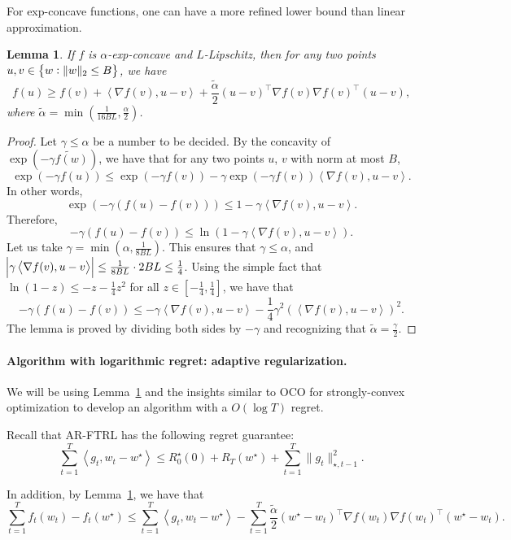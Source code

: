 \documentclass{article}
\newtheorem{lemma}{Lemma}
\newcommand{\inner}[2]{\left\langle #1,#2 \right\rangle}
\begin{document}
For exp-concave functions, one can have a more refined lower bound than linear approximation.
\begin{lemma}
If $f$ is $\alpha$-exp-concave and $L$-Lipschitz,
then for any two points $u, v \in \cbr{w: \| w \|_2 \leq B}$, we have
\[ f(u) \geq f(v) + \inner{\nabla f(v)}{u - v} + \frac{\tilde{\alpha}}{2}(u - v)^\top \nabla f(v) \nabla f(v)^\top (u - v), \]
where $\tilde{\alpha} = \min(\frac{1}{16BL}, \frac\alpha2)$.
\label{lem:quad-approx}
\end{lemma}
\begin{proof}
Let $\gamma \leq \alpha$ be a number to be decided.
By the concavity of $\exp(-\tilde{\gamma f(w)})$, we have that for any two points $u$, $v$ with norm at most $B$,
\[ \exp(-\gamma f(u)) \leq \exp(-\gamma f(v)) - \gamma \exp(-\gamma f(v)) \inner{\nabla f(v)}{u - v}. \]
In other words,
\[ \exp(-\gamma (f(u) - f(v))) \leq 1 - \gamma \inner{\nabla f(v)}{u - v}. \]
Therefore,
\[ -\gamma (f(u) - f(v)) \leq \ln(1 - \gamma \inner{\nabla f(v)}{u - v}). \]
Let us take $\gamma = \min(\alpha, \frac{1}{8BL})$. This ensures that $\gamma \leq \alpha$, and $\abs{\gamma \inner{\nabla f(v)}{u - v}} \leq \frac{1}{8BL} \cdot 2BL \leq \frac14$. Using the simple fact that $\ln(1-z) \leq - z - \frac 14 z^2$ for all
$z \in [-\frac14, \frac14]$, we have that
\[ -\gamma (f(u) - f(v)) \leq - \gamma \inner{\nabla f(v)}{u - v} - \frac14 \gamma^2 (\inner{\nabla f(v)}{u - v})^2. \]
The lemma is proved by dividing both sides by $-\gamma$ and recognizing that $\tilde{\alpha} = \frac{\gamma}2$.
\end{proof}

\paragraph{Algorithm with logarithmic regret: adaptive regularization.} We will be using Lemma~\ref{lem:quad-approx} and the insights similar to OCO for strongly-convex optimization to develop an algorithm with a $O(\log T)$ regret.

Recall that AR-FTRL has the following regret guarantee:
\[ \sum_{t=1}^T \inner{g_t}{w_t - w^\star} \leq R_0^\star(0) + R_T(w^\star) + \sum_{t=1}^T \| g_t \|_{\star, t-1}^2. \]

In addition, by Lemma~\ref{lem:quad-approx}, we have that
\begin{equation}
  \sum_{t=1}^T f_t(w_t) - f_t(w^\star) \leq \sum_{t=1}^T \inner{g_t}{w_t - w^\star} -  \sum_{t=1}^T \frac{\tilde{\alpha}}{2}(w^\star - w_t)^\top \nabla f(w_t) \nabla f(w_t)^\top (w^\star - w_t).
  \label{eqn:neg-exp-concave}
\end{equation}
\end{document}
